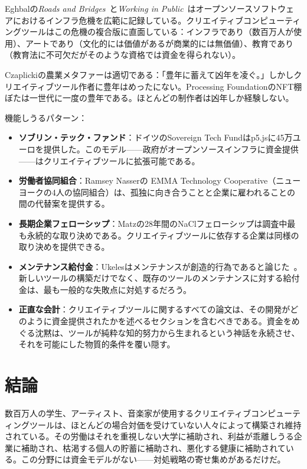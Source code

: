 \documentclass[10pt,letterpaper,twocolumn]{article}
\begin{document}
Eghbalの\emph{Roads and Bridges}~\citep{eghbal2016roads}と\emph{Working in Public}~\citep{eghbal2020working}はオープンソースソフトウェアにおけるインフラ危機を広範に記録している。クリエイティブコンピューティングツールはこの危機の複合版に直面している：インフラであり（数百万人が使用）、アートであり（文化的には価値があるが商業的には無価値）、教育であり（教育法に不可欠だがそのような資格では資金を得られない）。

Czaplickiの農業メタファーは適切である：「豊年に蓄えて凶年を凌ぐ。」しかしクリエイティブツール作者に豊年はめったにない。Processing FoundationのNFT棚ぼたは一世代に一度の豊年である。ほとんどの制作者は凶年しか経験しない。

機能しうるパターン：
\begin{itemize}
  \item \textbf{ソブリン・テック・ファンド}：ドイツのSovereign Tech Fundはp5.jsに45万ユーロを提供した。このモデル——政府がオープンソースインフラに資金提供——はクリエイティブツールに拡張可能である。
  \item \textbf{労働者協同組合}：Ramsey Nasserの EMMA Technology Cooperative（ニューヨークの4人の協同組合）は、孤独に向き合うことと企業に雇われることの間の代替案を提供する。
  \item \textbf{長期企業フェローシップ}：Matzの28年間のNaClフェローシップは調査中最も永続的な取り決めである。クリエイティブツールに依存する企業は同様の取り決めを提供できる。
  \item \textbf{メンテナンス給付金}：Ukelesはメンテナンスが創造的行為であると論じた~\citep{ukeles1969manifesto}。新しいツールの構築だけでなく、既存のツールのメンテナンスに対する給付金は、最も一般的な失敗点に対処するだろう。
  \item \textbf{正直な会計}：クリエイティブツールに関するすべての論文は、その開発がどのように資金提供されたかを述べるセクションを含むべきである。資金をめぐる沈黙は、ツールが純粋な知的努力から生まれるという神話を永続させ、それを可能にした物質的条件を覆い隠す。
\end{itemize}

\section{結論}

数百万人の学生、アーティスト、音楽家が使用するクリエイティブコンピューティングツールは、ほとんどの場合対価を受けていない人々によって構築され維持されている。その労働はそれを重視しない大学に補助され、利益が乖離しうる企業に補助され、枯渇する個人の貯蓄に補助され、悪化する健康に補助されている。この分野には資金モデルがない——対処戦略の寄せ集めがあるだけだ。
\end{document}
